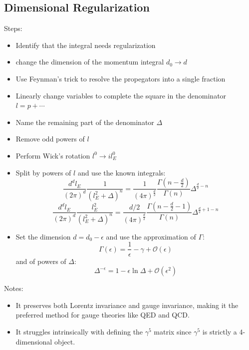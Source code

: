 \documentclass{article}
\begin{document}
\subsection{Dimensional Regularization}
Steps:
\begin{itemize}
    \item Identify that the integral needs regularization
    \item change the dimension of the momentum integral $d_0 \rightarrow d$
    \item Use Feynman's trick to resolve the propegators into a single fraction
    \item Linearly change variables to complete the square in the denominator $l = p + \cdots$
    \item Name the remaining part of the denominator $\Delta$
    \item Remove odd powers of $l$
    \item Perform Wick's rotation $l^0 \rightarrow il_E^0$
    \item Split by powers of $l$ and use the known integrals:
    \begin{equation}
        \frac{d^dl_E}{(2\pi)^d} \frac{1}{(l_E^2 + \Delta)^n} = \frac{1}{(4\pi)^\frac{d}{2}}\frac{\Gamma\left(n - \frac{d}{2}\right)}{\Gamma(n)}\Delta^{\frac{d}{2} - n}
    \end{equation}
    \begin{equation}
        \frac{d^dl_E}{(2\pi)^d} \frac{l_E^2}{(l_E^2 + \Delta)^n} = \frac{d/2}{(4\pi)^\frac{d}{2}}\frac{\Gamma\left(n - \frac{d}{2} - 1\right)}{\Gamma(n)}\Delta^{\frac{d}{2} + 1 - n}
    \end{equation}
    \item Set the dimension $d = d_0 - \epsilon$ and use the approximation of $\Gamma$:
    \begin{equation}
        \Gamma(\epsilon) = \frac{1}{\epsilon} - \gamma + \mathcal{O}(\epsilon)
    \end{equation}
    and of powers of $\Delta$:
    \begin{equation}
        \Delta^{-\epsilon} = 1 - \epsilon \ln\Delta + \mathcal{O}(\epsilon^2)
    \end{equation}
\end{itemize}
Notes:
\begin{itemize}
    \item It preserves both Lorentz invariance and gauge invariance, making it the preferred method for gauge theories like QED and QCD.
    \item It struggles intrinsically with defining the $\gamma^5$ matrix since $\gamma^5$ is strictly a 4-dimensional object.
\end{itemize}
\end{document}
